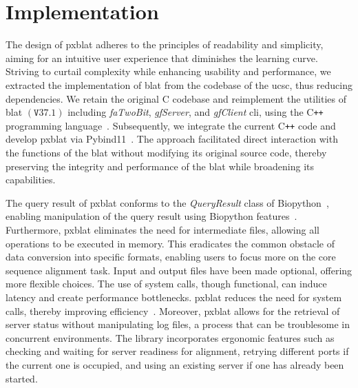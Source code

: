 \section*{Implementation}\label{sec:implementation}

The design of \gls{pxblat} adheres to the principles of readability and simplicity, aiming for an intuitive user experience that diminishes the learning curve.
Striving to curtail complexity while enhancing usability and performance, we extracted the implementation of \gls{blat} from the codebase of the \gls{ucsc}, thus reducing dependencies.
We retain the original C codebase and reimplement the utilities of \gls{blat} \(\left(\mathtt{V}37.1\right)\) including \emph{faTwoBit}, \emph{gfServer}, and \emph{gfClient} \gls{cli}, using the C\texttt{++} programming language~\citep{kent2002blat}.
Subsequently, we integrate the current C\texttt{++} code and develop \gls{pxblat} via Pybind11~\citep{pybind11}.
The approach facilitated direct interaction with the functions of the \gls{blat} without modifying its original source code, thereby preserving the integrity and performance of the \gls{blat} while broadening its capabilities.

The query result of \gls{pxblat} conforms to the \emph{QueryResult} class of Biopython~\citep{cock2009biopython}, enabling  manipulation of the query result using Biopython features~.
Furthermore, \gls{pxblat} eliminates the need for intermediate files, allowing all operations to be executed in memory.
This eradicates the common obstacle of data conversion into specific formats, enabling users to focus more on the core sequence alignment task.
Input and output files have been made optional, offering more flexible choices.
The use of system calls, though functional, can induce latency and create performance bottlenecks.
\gls{pxblat} reduces the need for system calls, thereby improving efficiency~.
Moreover, \gls{pxblat} allows for the retrieval of server status without manipulating log files, a process that can be troublesome in concurrent environments.
The library incorporates ergonomic features such as checking and waiting for server readiness for alignment, retrying different ports if the current one is occupied, and using an existing server if one has already been started.

